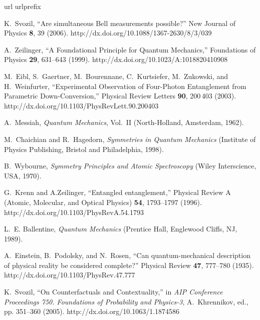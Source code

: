 \documentclass[rmp,amsfonts,showpacs,showkeys,preprint]{revtex4}
\begin{document}
%
%

\begin{thebibliography}{10}
\newcommand{\enquote}[1]{``#1''}
\expandafter\ifx\csname url\endcsname\relax
  \def\url#1{{#1}}\fi
\expandafter\ifx\csname urlprefix\endcsname\relax\def\urlprefix{}\fi

K.~Svozil, \enquote{Are simultaneous Bell measurements possible?} New Journal
  of Physics {\bf 8}, 39 (2006).
\newline http://dx.doi.org/10.1088/1367-2630/8/3/039

A.~Zeilinger, \enquote{A Foundational Principle for Quantum Mechanics,}
  Foundations of Physics {\bf 29}, 631--643 (1999).
\newline http://dx.doi.org/10.1023/A:1018820410908

M.~Eibl, S.~Gaertner, M.~Bourennane, C.~Kurtsiefer, M.~Zukowski, and
  H.~Weinfurter, \enquote{Experimental Observation of Four-Photon Entanglement
  from Parametric Down-Conversion,} Physical Review Letters {\bf 90}, 200\,403
  (2003).
\newline http://dx.doi.org/10.1103/PhysRevLett.90.200403

A.~Messiah, {\em Quantum Mechanics\/}, Vol.~II (North-Holland, Amsterdam,
  1962).

M.~Chaichian and R.~Hagedorn, {\em Symmetries in Quantum Mechanics\/}
  (Institute of Physics Publishing, Bristol and Philadelphia, 1998).

B.~Wybourne, {\em Symmetry Principles and Atomic Spectroscopy\/} (Wiley
  Interscience, USA, 1970).

G.~Krenn and A.Zeilinger, \enquote{Entangled entanglement,} Physical Review A
  (Atomic, Molecular, and Optical Physics) {\bf 54}, 1793--1797 (1996).
\newline http://dx.doi.org/10.1103/PhysRevA.54.1793

L.~E. Ballentine, {\em Quantum Mechanics\/} (Prentice Hall, Englewood Cliffs,
  NJ, 1989).

A.~Einstein, B.~Podolsky, and N.~Rosen, \enquote{Can quantum-mechanical
  description of physical reality be considered complete?} Physical Review {\bf
  47}, 777--780 (1935).
\newline http://dx.doi.org/10.1103/PhysRev.47.777

K.~Svozil, \enquote{On Counterfactuals and Contextuality,} in {\em AIP
  Conference Proceedings 750. {F}oundations of Probability and Physics-3\/},
  A.~Khrennikov, ed.,  pp. 351--360 (2005).
\newline http://dx.doi.org/10.1063/1.1874586


\end{thebibliography}
\end{document}
